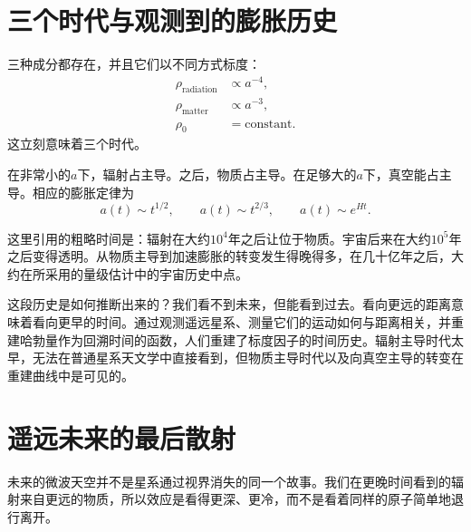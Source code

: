 \begin{classroomqa}
\end{classroomqa}

\section{三个时代与观测到的膨胀历史}

三种成分都存在，并且它们以不同方式标度：
\begin{equation}
\begin{aligned}
\rho_{\text{radiation}}&\propto a^{-4},\\
\rho_{\text{matter}}&\propto a^{-3},\\
\rho_0&=\text{constant}.
\end{aligned}
\end{equation}
这立刻意味着三个时代。

在非常小的\(a\)下，辐射占主导。之后，物质占主导。在足够大的\(a\)下，真空能占主导。相应的膨胀定律为
\begin{equation}
a(t)\sim t^{1/2},
\qquad
a(t)\sim t^{2/3},
\qquad
a(t)\sim e^{Ht}.
\end{equation}

这里引用的粗略时间是：辐射在大约\(10^4\)年之后让位于物质。宇宙后来在大约\(10^5\)年之后变得透明。从物质主导到加速膨胀的转变发生得晚得多，在几十亿年之后，大约在所采用的量级估计中的宇宙历史中点。

这段历史是如何推断出来的？我们看不到未来，但能看到过去。看向更远的距离意味着看向更早的时间。通过观测遥远星系、测量它们的运动如何与距离相关，并重建哈勃量作为回溯时间的函数，人们重建了标度因子的时间历史。辐射主导时代太早，无法在普通星系天文学中直接看到，但物质主导时代以及向真空主导的转变在重建曲线中是可见的。

\section{遥远未来的最后散射}

未来的微波天空并不是星系通过视界消失的同一个故事。我们在更晚时间看到的辐射来自更远的物质，所以效应是看得更深、更冷，而不是看着同样的原子简单地退行离开。

\begin{classroomqa}
\end{classroomqa}

